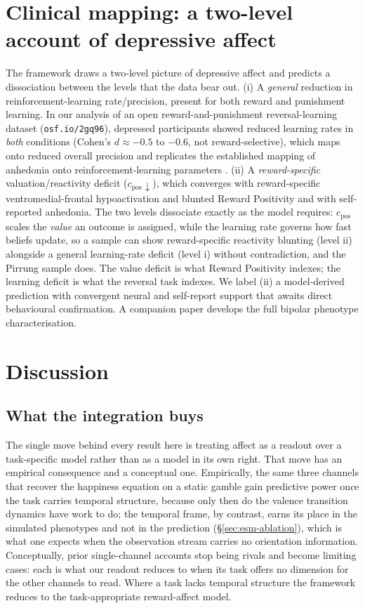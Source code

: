 \documentclass[11pt,a4paper]{article}
\begin{document}
\section{Clinical mapping: a two-level account of depressive affect}\label{sec:clinical}
The framework draws a two-level picture of depressive affect and predicts a
dissociation between the levels that the data bear out. (i) A \emph{general}
reduction in reinforcement-learning rate/precision, present for both reward and
punishment learning. In our analysis of an open reward-and-punishment reversal-learning
dataset (\texttt{osf.io/2gq96}), depressed participants showed reduced learning rates in
\emph{both} conditions (Cohen's $d\approx-0.5$ to $-0.6$, not reward-selective), which
maps onto reduced overall precision and replicates the established mapping of anhedonia
onto reinforcement-learning parameters \citep{huys2013mapping}. (ii) A
\emph{reward-specific} valuation/reactivity deficit ($c_{\text{pos}}\!\downarrow$),
which converges with reward-specific ventromedial-frontal hypoactivation and blunted
Reward Positivity \citep{pirrung2025} and with self-reported anhedonia. The two levels
dissociate exactly as the model requires: $c_{\text{pos}}$ scales the \emph{value} an
outcome is assigned, while the learning rate governs how fast beliefs update, so a
sample can show reward-specific reactivity blunting (level ii) alongside a general
learning-rate deficit (level i) without contradiction, and the Pirrung sample does. The
value deficit is what Reward Positivity indexes; the learning deficit is what the
reversal task indexes. We label (ii) a model-derived prediction with convergent neural
and self-report support that awaits direct behavioural confirmation. A companion paper
develops the full bipolar phenotype characterisation.

\section{Discussion}\label{sec:discussion}
\subsection{What the integration buys}
The single move behind every result here is treating affect as a readout over a
task-specific model rather than as a model in its own right. That move has an empirical
consequence and a conceptual one. Empirically, the same three channels that recover the
happiness equation on a static gamble gain predictive power once the task carries
temporal structure, because only then do the valence transition dynamics have work to
do; the temporal frame, by contrast, earns its place in the simulated phenotypes and
not in the prediction (\S\ref{sec:esm-ablation}), which is what one expects when the
observation stream carries no orientation information. Conceptually, prior single-channel accounts stop being rivals and become limiting
cases: each is what our readout reduces to when its task offers no dimension for the
other channels to read. Where a task lacks temporal structure the framework reduces to
the task-appropriate reward-affect model.
\end{document}
